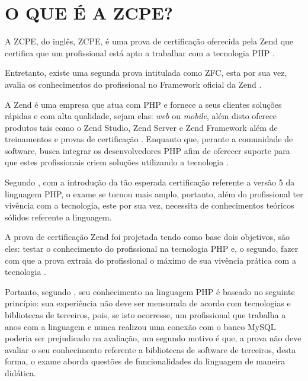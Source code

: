 \chapter{O QUE É A ZCPE?}
\label{zcpe}

A \acs{ZCPE}, do inglês, \acl{ZCPE}, é uma prova de certificação oferecida
pela Zend que certifica que um profissional está apto a trabalhar com a
tecnologia \acs{PHP} \cite{websiteZendZCPE}.

Entretanto, existe uma segunda prova intitulada como \ac{ZFC},
esta por sua vez, avalia os conhecimentos do profissional no
Framework oficial da Zend \cite{websiteZendZFC}.

A Zend é uma empresa que atua com \acs{PHP} e fornece a seus clientes soluções 
rápidas e com alta qualidade, sejam elas: \textit{web} ou \textit{mobile}, além
disto oferece produtos tais como o \acs{Zend Studio}, \acs{Zend Server} e 
\acs{Zend Framework} além de treinamentos e provas de certificação 
\cite{websiteZendCompany}. Enquanto que, perante a comunidade de software, busca
integrar os desenvolvedores \acs{PHP} afim de oferecer suporte para que estes 
profissionais criem soluções utilizando a tecnologia \cite{websiteZendCompany}.

Segundo , com a introdução da tão
esperada certificação referente a versão 5 da linguagem \acs{PHP}, o exame se
tornou mais amplo, portanto, além do profissional ter vivência com a
tecnologia, este por sua vez, necessita de conhecimentos teóricos sólidos
referente a linguagem.

A prova de certificação Zend foi projetada tendo como base dois objetivos, são
eles: testar o conhecimento do profissional na tecnologia \acs{PHP} e, o
segundo, fazer com que a prova extraia do profissional o máximo de sua vivência 
prática com a tecnologia \cite{theZendPHPCertificationPracticeTestBook}.

Portanto, segundo , seu
conhecimento na linguagem \acs{PHP} é baseado no seguinte princípio: sua
experiência não deve ser mensurada de acordo com tecnologias
e bibliotecas de terceiros, pois, se isto ocorresse, um profissional que
trabalha a anos com a linguagem e nunca realizou uma conexão com o banco 
\acs{MySQL} poderia ser prejudicado na avaliação, um segundo motivo é que, a
prova não deve avaliar o seu conhecimento referente a bibliotecas de software
de terceiros, desta forma, o exame aborda questões de funcionalidades da 
linguagem  de maneira didática.

